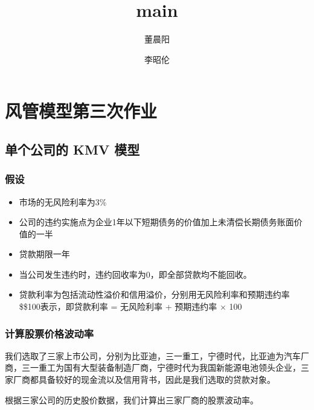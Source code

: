\documentclass[11pt]{article}
\author{董晨阳\and 李昭伦}
\title{main}
\providecommand{\tightlist}{%
      \setlength{\itemsep}{0pt}\setlength{\parskip}{0pt}}
\begin{document}
    \maketitle




    \hypertarget{ux98ceux7ba1ux6a21ux578bux7b2cux4e09ux6b21ux4f5cux4e1a}{%
\section{风管模型第三次作业}\label{ux98ceux7ba1ux6a21ux578bux7b2cux4e09ux6b21ux4f5cux4e1a}}

    \hypertarget{ux5355ux4e2aux516cux53f8ux7684-kmv-ux6a21ux578b}{%
\subsection{单个公司的 KMV
模型}\label{ux5355ux4e2aux516cux53f8ux7684-kmv-ux6a21ux578b}}

\hypertarget{ux5047ux8bbe}{%
\subsubsection{假设}\label{ux5047ux8bbe}}

\begin{itemize}
\tightlist
\item
  市场的无风险利率为3\%
\item
  公司的违约实施点为企业1年以下短期债务的价值加上未清偿长期债务账面价值的一半
\item
  贷款期限一年
\item
  当公司发生违约时，违约回收率为0，即全部贷款均不能回收。
\item
  贷款利率为包括流动性溢价和信用溢价，分别用无风险利率和预期违约率\$\times\$100表示，即贷款利率
  = 无风险利率 + 预期违约率 \(\times\) 100
\end{itemize}

\hypertarget{ux8ba1ux7b97ux80a1ux7968ux4ef7ux683cux6ce2ux52a8ux7387}{%
\subsubsection{计算股票价格波动率}\label{ux8ba1ux7b97ux80a1ux7968ux4ef7ux683cux6ce2ux52a8ux7387}}

我们选取了三家上市公司，分别为比亚迪，三一重工，宁德时代，比亚迪为汽车厂商，三一重工为国有大型装备制造厂商，宁德时代为我国新能源电池领头企业，三家厂商都具备较好的现金流以及信用背书，因此是我们选取的贷款对象。

根据三家公司的历史股价数据，我们计算出三家厂商的股票波动率。
\end{document}
